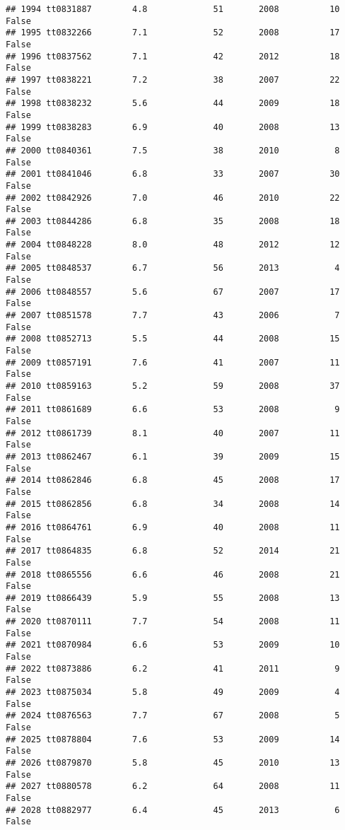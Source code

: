 \documentclass[
]{article}
\begin{document}
\begin{verbatim}
## 1994 tt0831887        4.8             51       2008          10   False
## 1995 tt0832266        7.1             52       2008          17   False
## 1996 tt0837562        7.1             42       2012          18   False
## 1997 tt0838221        7.2             38       2007          22   False
## 1998 tt0838232        5.6             44       2009          18   False
## 1999 tt0838283        6.9             40       2008          13   False
## 2000 tt0840361        7.5             38       2010           8   False
## 2001 tt0841046        6.8             33       2007          30   False
## 2002 tt0842926        7.0             46       2010          22   False
## 2003 tt0844286        6.8             35       2008          18   False
## 2004 tt0848228        8.0             48       2012          12   False
## 2005 tt0848537        6.7             56       2013           4   False
## 2006 tt0848557        5.6             67       2007          17   False
## 2007 tt0851578        7.7             43       2006           7   False
## 2008 tt0852713        5.5             44       2008          15   False
## 2009 tt0857191        7.6             41       2007          11   False
## 2010 tt0859163        5.2             59       2008          37   False
## 2011 tt0861689        6.6             53       2008           9   False
## 2012 tt0861739        8.1             40       2007          11   False
## 2013 tt0862467        6.1             39       2009          15   False
## 2014 tt0862846        6.8             45       2008          17   False
## 2015 tt0862856        6.8             34       2008          14   False
## 2016 tt0864761        6.9             40       2008          11   False
## 2017 tt0864835        6.8             52       2014          21   False
## 2018 tt0865556        6.6             46       2008          21   False
## 2019 tt0866439        5.9             55       2008          13   False
## 2020 tt0870111        7.7             54       2008          11   False
## 2021 tt0870984        6.6             53       2009          10   False
## 2022 tt0873886        6.2             41       2011           9   False
## 2023 tt0875034        5.8             49       2009           4   False
## 2024 tt0876563        7.7             67       2008           5   False
## 2025 tt0878804        7.6             53       2009          14   False
## 2026 tt0879870        5.8             45       2010          13   False
## 2027 tt0880578        6.2             64       2008          11   False
## 2028 tt0882977        6.4             45       2013           6   False

\end{verbatim}
\end{document}
